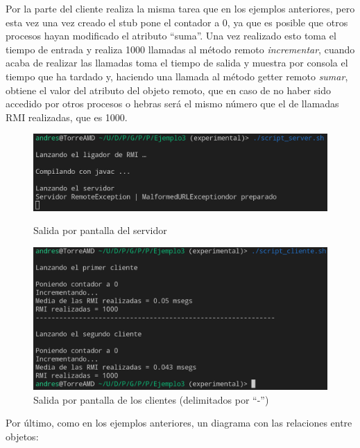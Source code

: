 \documentclass{article}
\begin{document}
\bigskip

Por la parte del cliente realiza la misma tarea que en los ejemplos anteriores, pero esta vez una vez creado el stub pone el contador a 0, ya que es posible que otros procesos hayan modificado el atributo ``suma''. Una vez realizado esto toma el tiempo de entrada y realiza 1000 llamadas al método remoto \textit{incrementar}, cuando acaba de realizar las llamadas toma el tiempo de salida y muestra por consola el tiempo que ha tardado y, haciendo una llamada al método getter remoto \textit{sumar}, obtiene el valor del atributo del objeto remoto, que en caso de no haber sido accedido por otros procesos o hebras será el mismo número que el de llamadas RMI realizadas, que es 1000.

\begin{figure}[H]
    \centering
    \begin{minipage}[H]{0.45\textwidth}
        \centering
        \includegraphics[width=\textwidth]{imagenes/E3S1.png}
        \caption{Salida por pantalla del servidor}
    \end{minipage}
    \hfill
    \begin{minipage}[H]{0.45\textwidth}
        \centering
        \includegraphics[width=\textwidth]{imagenes/E3C1.png}
        \caption{Salida por pantalla de los clientes (delimitados por ``-'')}
    \end{minipage}
\end{figure}

\newpage

Por último, como en los ejemplos anteriores, un diagrama con las relaciones entre objetos:
\end{document}
